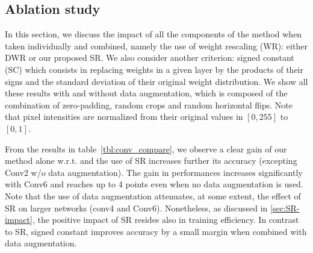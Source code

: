   \subsection{Ablation study}
  In this section, we discuss the impact of all the components of the method
  when taken individually and combined,  namely the use of weight rescaling
  (WR): either DWR or our proposed SR.   We also consider another criterion:
  signed constant  (SC) which consists in replacing weights in a given layer by
  the products of their signs and the standard deviation of their original
  weight distribution.  We show  all these results with and without data
  augmentation, which is composed of the combination of zero-padding,  random crops and
  random  horizontal flips.   Note that  pixel intensities are normalized  from
  their original values in $[0,255]$ to $[0,1]$.
    
  From the results in table~\ref{tbl:conv_compare}, we observe a clear gain of
  our method alone w.r.t.  \cite{DBLP:conf/nips/ZhouLLY19} and the use of SR
  increases further its accuracy (excepting Conv2 w/o data augmentation).  The
  gain in performances increases  significantly with Conv6 and reaches up to 4
  points even when no data augmentation is used.   Note that the use of data
  augmentation attenuates, at some extent, the effect of \ac{SR} on larger networks
  (conv4 and Conv6). Nonetheless,  as discussed in \cref{sec:SR-impact}, the
  positive impact of \ac{SR} resides also in training efficiency.   In contrast to
  SR, signed constant improves accuracy by a small margin when combined with
  data augmentation. 
  
  
